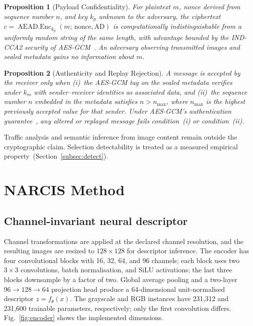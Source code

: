 ﻿\documentclass[10pt,journal]{IEEEtran}
\newtheorem{proposition}{Proposition}
\begin{document}
\begin{proposition}[Payload Confidentiality]
\label{prop:conf}
For plaintext $m$, nonce derived from sequence number $n$, and key $k_p$
unknown to the adversary, the ciphertext
$c=\operatorname{AEAD.Enc}_{k_p}(m;\,\mathrm{nonce},\mathrm{AD})$
is computationally indistinguishable from a uniformly random string of
the same length, with advantage bounded by the IND-CCA2 security of
AES-GCM~\cite{nist2007gcm}. An adversary observing transmitted images
and sealed metadata gains no information about $m$.
\end{proposition}

\begin{proposition}[Authenticity and Replay Rejection]
\label{prop:auth}
A message is accepted by the receiver only when
(i)~the AES-GCM tag on the sealed metadata verifies under $k_m$
    with sender--receiver identities as associated data, and
(ii)~the sequence number $n$ embedded in the metadata satisfies
    $n>n_{\max}$, where $n_{\max}$ is the highest previously accepted
    value for that sender. Under AES-GCM's authentication
    guarantee~\cite{nist2007gcm}, any altered or replayed message
    fails condition~(i) or condition~(ii).
\end{proposition}

Traffic analysis and semantic inference from image content remain
outside the cryptographic claim. Selection detectability is treated
as a measured empirical property~(Section~\ref{subsec:detect}).

\section{NARCIS Method}
\label{sec:method}

\subsection{Channel-invariant neural descriptor}

Channel transformations are applied at the declared channel resolution,
and the resulting images are resized to $128\times128$ for descriptor
inference. The encoder has four convolutional blocks with 16, 32, 64,
and 96 channels; each block uses two $3\times3$ convolutions, batch
normalisation, and SiLU activations; the last three blocks downsample
by a factor of two. Global average pooling and a two-layer
$96\to128\to64$ projection head produce a 64-dimensional unit-normalised
descriptor $z=f_\theta(x)$. The grayscale and RGB instances have 231{,}312
and 231{,}600 trainable parameters, respectively; only the first
convolution differs. Fig.~\ref{fig:encoder} shows the implemented
dimensions.
\end{document}
